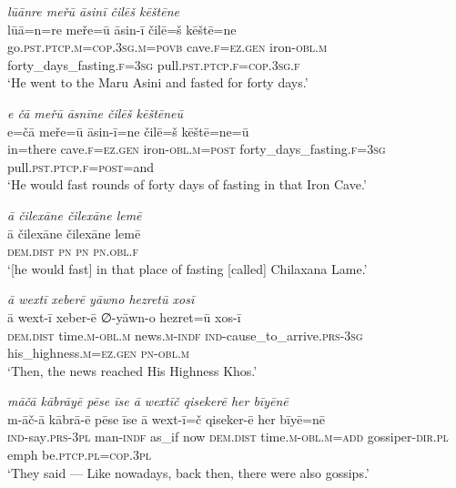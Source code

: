 \ea \label{ŽP.118}
\textit{lūānre meřū āsinī čilēš kēštēne} \\ 
\gll lūā=n=re meře=ū āsin-ī čilē=š kēštē=ne \\ 
 go\textsc{.pst}\textsc{.ptcp}\textsc{.m}\textsc{=cop}\textsc{.3sg}\textsc{.m}\textsc{=\textsc{povb}} cave\textsc{.f}\textsc{\textsc{=ez.gen}} iron\textsc{-obl}\textsc{.m} forty\_days\_fasting\textsc{.f}\textsc{=3sg} pull\textsc{.pst}\textsc{.ptcp}\textsc{.f}\textsc{=cop}\textsc{.3sg}\textsc{.f} \\ 
\glt `He went to the Maru Asini and fasted for forty days.'
\z 
 
\ea \label{ŽP.121}
\textit{e čā meřū āsnīne čilēš kēštēneū} \\ 
\gll e=čā meře=ū āsin-ī=ne čilē=š kēštē=ne=ū \\ 
 in=there cave\textsc{.f}\textsc{\textsc{=ez.gen}} iron\textsc{-obl}\textsc{.m}\textsc{=\textsc{post}} forty\_days\_fasting\textsc{.f}\textsc{=3sg} pull\textsc{.pst}\textsc{.ptcp}\textsc{.f}\textsc{=\textsc{post}}=and \\ 
\glt `He would fast rounds of forty days of fasting in that Iron Cave.'
\z 
 
\ea \label{ŽP.123}
\textit{ā čilexāne čilexāne lemē} \\ 
\gll ā čilexāne čilexāne lemē \\ 
 \textsc{dem.dist} \textsc{pn} \textsc{pn} \textsc{pn}\textsc{.obl}\textsc{.f} \\ 
\glt `[he would fast] in that place of fasting [called] Chilaxana Lame.'
\z 
 
\ea \label{ŽP.124}
\textit{ā wextī xeberē yāwno hezretū xosī} \\ 
\gll ā wext-ī xeber-ē ∅-yāwn-o hezret=ū xos-ī \\ 
 \textsc{dem.dist} time\textsc{.m}\textsc{-obl}\textsc{.m} news\textsc{.m}\textsc{-indf} \textsc{ind-}cause\_to\_arrive\textsc{.prs}\textsc{-3sg} his\_highness\textsc{.m}\textsc{\textsc{=ez.gen}} \textsc{pn}\textsc{-obl}\textsc{.m} \\ 
\glt `Then, the news reached His Highness Khos.'
\z 
 
\ea \label{ŽP.125}
\textit{māčā kābrāyē pēse īse ā wextīč qisekerē her bīyēnē} \\ 
\gll m-āč-ā kābrā-ē pēse īse ā wext-ī=č qiseker-ē her bīyē=nē \\ 
 \textsc{ind-}say\textsc{.prs}\textsc{-3pl} man\textsc{-indf} as\_if now \textsc{dem.dist} time\textsc{.m}\textsc{-obl}\textsc{.m}\textsc{=add} gossiper\textsc{-dir}\textsc{.pl} emph be\textsc{.ptcp}\textsc{.pl}\textsc{=cop}\textsc{.3pl} \\ 
\glt `They said — Like nowadays, back then, there were also gossips.'
\z 
 
